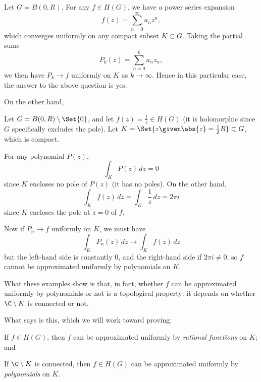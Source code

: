 \begin{example}
	Let $G = B(0, R)$.
	For any $f \in H(G)$, we have a power series expansion
	\[
		f(z) = \sum_{n = 0}^\infty a_n z^n,
	\]
	which converges uniformly on any compact subset $K \subset G$.
	Taking the partial sums
	\[
		P_k(z) = \sum_{n = 0}^k a_n z_n,
	\]
	we then have $P_k \to f$ uniformly on $K$ as $k \to \infty$.
	Hence in this particular case, the answer to the above question is yes.
\end{example}

On the other hand,

\begin{example}
	Let $G = B(0, R) \setminus \Set{0}$, and let $f(z) = \frac{1}{z} \in H(G)$ (it is holomorphic since $G$ specifically excludes the pole).
	Let $K = \Set{z \given \abs{z} = \frac{1}{2} R} \subset G$, which is compact.

	For any polynomial $P(z)$,
	\[
		\int_K P(z) \, d z = 0
	\]
	since $K$ encloses no pole of $P(z)$ (it has no poles).
	On the other hand,
	\[
		\int_K f(z) \, d z = \int_K \frac{1}{z} \, d z = 2 \pi i
	\]
	since $K$ encloses the pole at $z = 0$ of $f$.

	Now if $P_n \to f$ uniformly on $K$, we must have
	\[
		\int_K P_n(z) \, d z \to \int_K f(z) \, d z
	\]
	but the left-hand side is constantly $0$, and the right-hand side if $2 \pi i \neq 0$, so $f$ cannot be approximated uniformly by polynomials on $K$.
\end{example}

What these examples show is that, in fact, whether $f$ can be approximated uniformly by polynomials or not is a topological property: it depends on whether $\C \setminus K$ is connected or not.

What  says is this, which we will work toward proving:
\begin{items}
	\item If $f \in H(G)$, then $f$ can be approximated uniformly by \emph{rational functions} on $K$; and
	\item If $\C \setminus K$ is connected, then $f \in H(G)$ can be approximated uniformly by \emph{polynomials} on $K$.
\end{items}
